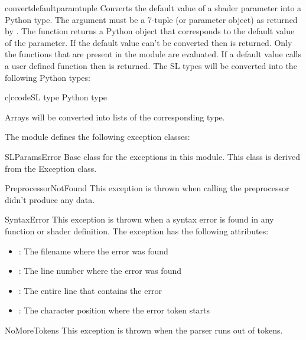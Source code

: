 \begin{funcdesc}{convertdefault}{paramtuple}
Converts the default value of a shader parameter into a Python
type. The argument  must be a 7-tuple (or parameter object) as
returned by . The function returns a Python object that corresponds to
the default value of the parameter. If the default value can't be
converted then  is returned. Only the functions that are
present in the  module are evaluated. If a default value
calls a user defined function then  is returned. The SL
types will be converted into the following Python types:

\begin{tableii}{c|c}{code}{SL type }{ Python type}
\end{tableii}

Arrays will be converted into lists of the corresponding type.
\end{funcdesc}

The module defines the following exception classes:

\begin{excdesc}{SLParamsError}
Base class for the exceptions in this module. This class is derived
from the Exception class.
\end{excdesc}

\begin{excdesc}{PreprocessorNotFound}
This exception is thrown when calling the preprocessor didn't produce
any data.
\end{excdesc}

\begin{excdesc}{SyntaxError}
This exception is thrown when a syntax error is found in any function
or shader definition. The exception has the following attributes:

\begin{itemize}
\item {}: The filename where the error was found 
\item {}: The line number where the error was found 
\item {}: The entire line that contains the error 
\item {}: The character position where the error token starts
\end{itemize}
\end{excdesc}

\begin{excdesc}{NoMoreTokens}
This exception is thrown when the parser runs out of tokens.
\end{excdesc}
